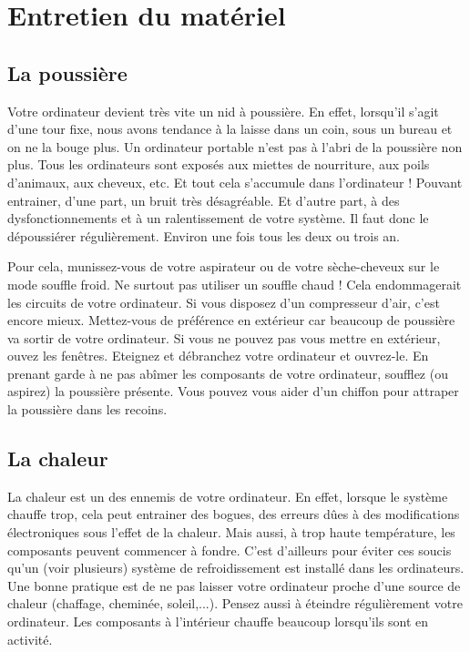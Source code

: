 \documentclass[12pt]{book}
\begin{document}
	\section{Entretien du matériel}
		\subsection{La poussière}
			Votre ordinateur devient très vite un nid à poussière.
			En effet, lorsqu'il s'agit d'une tour fixe, nous avons tendance à la laisse dans un coin, sous un bureau et on ne la bouge plus.
			Un ordinateur portable n'est pas à l'abri de la poussière non plus.
			Tous les ordinateurs sont exposés aux miettes de nourriture, aux poils d'animaux, aux cheveux, etc. Et tout cela s'accumule dans l'ordinateur ! 
			Pouvant entrainer, d'une part, un bruit très désagréable.
			Et d'autre part, à des dysfonctionnements et à un ralentissement de votre système.
			Il faut donc le dépoussiérer régulièrement.
			Environ une fois tous les deux ou trois an.\par
			Pour cela, munissez-vous de votre aspirateur ou de votre sèche-cheveux sur le mode souffle froid.
			Ne surtout pas utiliser un souffle chaud !
			Cela endommagerait les circuits de votre ordinateur.
			Si vous disposez d'un compresseur d'air, c'est encore mieux.
			Mettez-vous de préférence en extérieur car beaucoup de poussière va sortir de votre ordinateur.
			Si vous ne pouvez pas vous mettre en extérieur, ouvez les fenêtres.
			Eteignez et débranchez votre ordinateur et ouvrez-le.
			En prenant garde à ne pas abîmer les composants de votre ordinateur, soufflez (ou aspirez) la poussière présente.
			Vous pouvez vous aider d'un chiffon pour attraper la poussière dans les recoins.
		\subsection{La chaleur}
			La chaleur est un des ennemis de votre ordinateur.
			En effet, lorsque le système chauffe trop, cela peut entrainer des bogues, des erreurs dûes à des modifications électroniques sous l'effet de la chaleur.
			Mais aussi, à trop haute température, les composants peuvent commencer à fondre.
			C'est d'ailleurs pour éviter ces soucis qu'un (voir plusieurs) système de refroidissement est installé dans les ordinateurs. 
			Une bonne pratique est de ne pas laisser votre ordinateur proche d'une source de chaleur (chaffage, cheminée, soleil,...). 
			Pensez aussi à éteindre régulièrement votre ordinateur.
			Les composants à l'intérieur chauffe beaucoup lorsqu'ils sont en activité.
\end{document}
